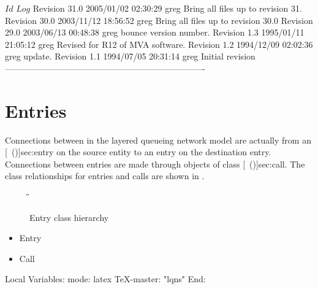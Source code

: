\C 
\C $Id$
\C 
\C $Log$
\C Revision 31.0  2005/01/02 02:30:29  greg
\C Bring all files up to revision 31.
\C
\C Revision 30.0  2003/11/12 18:56:52  greg
\C Bring all files up to revision 30.0
\C
\C Revision 29.0  2003/06/13 00:48:38  greg
\C bounce version number.
\C
\C Revision 1.3  1995/01/11 21:05:12  greg
\C Revised for R12 of MVA software.
\C
\C Revision 1.2  1994/12/09  02:02:36  greg
\C update.
\C
\C Revision 1.1  1994/07/05  20:31:14  greg
\C Initial revision
\C
\C ----------------------------------------------------------------------
\chapter{Entries}
\label{sec:entries}

Connections between  in the layered
queueing network model are actually from an
[~(\Sec\Ref)]{sec:entry} on the source entity to an
entry on the destination entry.  Connections between entries are made
through objects of class [~(\Sec\Ref)]{sec:call}.
The class relationships for entries and calls are shown in
.

\begin{figure}[htbp]
  \label{fig:entry}
  \begin{center}
    \T \tex \leavevmode 
    \caption{Entry class hierarchy}
    \H {}
  \end{center}
\end{figure}

\begin{iftex}
\begin{itemize}
\item Entry
\item Call
\end{itemize}
\end{iftex}



\C Local Variables: 
\C mode: latex
\C TeX-master: "lqns"
\C End: 
